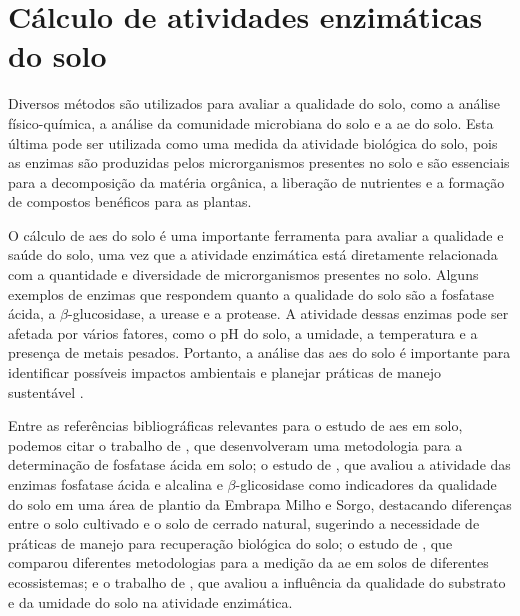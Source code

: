 \section{Cálculo de atividades enzimáticas do solo}\label{sec:calculo_enzimatico}
Diversos métodos são utilizados para avaliar a qualidade do solo, como a análise físico-química, a análise da comunidade microbiana do solo e a \ac{ae} do solo. Esta última pode ser utilizada como uma medida da atividade biológica do solo, pois as enzimas são produzidas pelos microrganismos presentes no solo e são essenciais para a decomposição da matéria orgânica, a liberação de nutrientes e a formação de compostos benéficos para as plantas.

O cálculo de \acp{ae} do solo é uma importante ferramenta para avaliar a qualidade e saúde do solo, uma vez que a atividade enzimática está diretamente relacionada com a quantidade e diversidade de microrganismos presentes no solo. Alguns exemplos de enzimas que respondem quanto a qualidade do solo são a fosfatase ácida, a $\beta$-glucosidase, a urease e a protease. A atividade dessas enzimas pode ser afetada por vários fatores, como o pH do solo, a umidade, a temperatura e a presença de metais pesados. Portanto, a análise das \acp{ae} do solo é importante para identificar possíveis impactos ambientais e planejar práticas de manejo sustentável \cite{agrogalaxy}.


Entre as referências bibliográficas relevantes para o estudo de \acp{ae} em solo, podemos citar o trabalho de \citet{tabatabai1969use}, que desenvolveram uma metodologia para a determinação de fosfatase ácida em solo; o estudo de \citet{ribeiro2019atividade}, que avaliou a atividade das enzimas fosfatase ácida e alcalina e $\beta$-glicosidase como indicadores da qualidade do solo em uma área de plantio da Embrapa Milho e Sorgo, destacando diferenças entre o solo cultivado e o solo de cerrado natural, sugerindo a necessidade de práticas de manejo para recuperação biológica do solo; o estudo de \citet{allison2010measurement}, que comparou diferentes metodologias para a medição da \ac{ae} em solos de diferentes ecossistemas; e o trabalho de \citet{sinsabaugh2008stoichiometry}, que avaliou a influência da qualidade do substrato e da umidade do solo na atividade enzimática.

